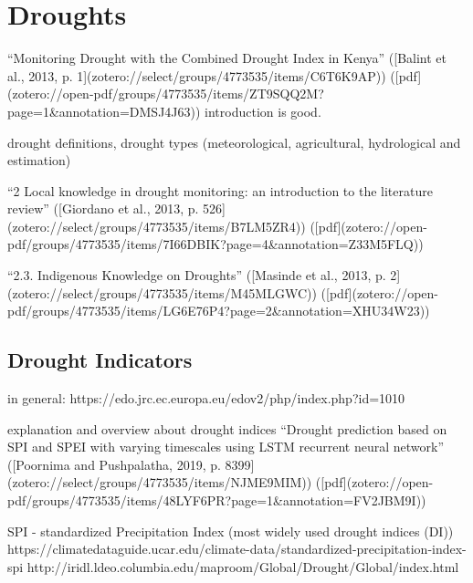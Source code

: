 \section{Droughts}
“Monitoring Drought with the Combined Drought Index in Kenya” ([Balint et al., 2013, p. 1](zotero://select/groups/4773535/items/C6T6K9AP)) ([pdf](zotero://open-pdf/groups/4773535/items/ZT9SQQ2M?page=1\&annotation=DMSJ4J63))
introduction is good.

drought definitions, drought types (meteorological, agricultural, hydrological and estimation)




“2 Local knowledge in drought monitoring: an introduction to the literature review” ([Giordano et al., 2013, p. 526](zotero://select/groups/4773535/items/B7LM5ZR4)) ([pdf](zotero://open-pdf/groups/4773535/items/7I66DBIK?page=4&annotation=Z33M5FLQ))

“2.3. Indigenous Knowledge on Droughts” ([Masinde et al., 2013, p. 2](zotero://select/groups/4773535/items/M45MLGWC)) ([pdf](zotero://open-pdf/groups/4773535/items/LG6E76P4?page=2&annotation=XHU34W23))


\subsection{Drought Indicators}

in general: https://edo.jrc.ec.europa.eu/edov2/php/index.php?id=1010

explanation and overview about drought indices “Drought prediction based on SPI and SPEI with varying timescales using LSTM recurrent neural network” ([Poornima and Pushpalatha, 2019, p. 8399](zotero://select/groups/4773535/items/NJME9MIM)) ([pdf](zotero://open-pdf/groups/4773535/items/48LYF6PR?page=1&annotation=FV2JBM9I))

SPI - standardized Precipitation Index (most widely used drought indices (DI)) 
https://climatedataguide.ucar.edu/climate-data/standardized-precipitation-index-spi
http://iridl.ldeo.columbia.edu/maproom/Global/Drought/Global/index.html

